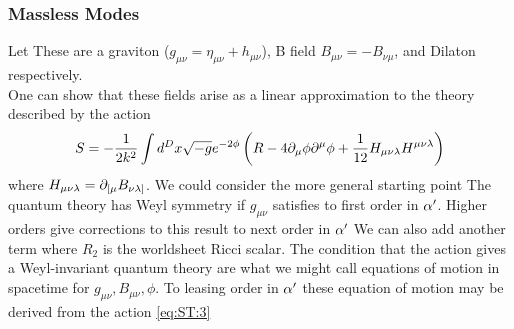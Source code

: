 \documentclass{article}
\begin{document}
\subsubsection*{Massless Modes}
Let 
These are a graviton ($g_{\mu\nu} = \eta_{\mu\nu} + h_{\mu\nu}$), B field $B_{\mu\nu} = -B_{\nu\mu}$, and Dilaton respectively. \\
One can show that these fields arise as a linear approximation to the theory described by the action
\begin{align} \label{eq:ST:3}
S = -\frac{1}{2k^2} \int d^D x \sqrt{-g} e^{-2\phi} \left( R - 4\partial_\mu \phi \partial^\mu \phi + \frac{1}{12} H_{\mu\nu\lambda}H^{\mu\nu\lambda}\right)
\end{align}
where $H_{\mu\nu\lambda}=\partial_{[\mu}B_{\nu\lambda]}$.
We could consider the more general starting point 
The quantum theory has Weyl symmetry if $g_{\mu\nu}$ satisfies 
to first order in $\alpha^\prime$. Higher orders give corrections to this result to next order in $\alpha^\prime$
We can also add another term 
where $R_2$ is the worldsheet Ricci scalar. The condition that the action 
gives a Weyl-invariant quantum theory are what we might call equations of motion in spacetime for $g_{\mu\nu}, B_{\mu\nu}, \phi$. To leasing order in $\alpha^\prime$ these equation of motion may be derived from the action \ref{eq:ST:3}

\end{document}
